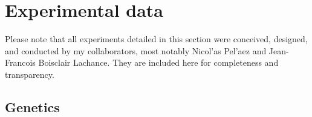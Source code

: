 \graphicspath{ {./figures/ratio/} }



\section{Experimental data}

Please note that all experiments detailed in this section were conceived, designed, and conducted by my collaborators, most notably Nicol'{a}s Pel'{a}ez and Jean-Francois Boisclair Lachance. They are included here for completeness and transparency.

\subsection{Genetics}
\label{appendix:ratio:genetics}

